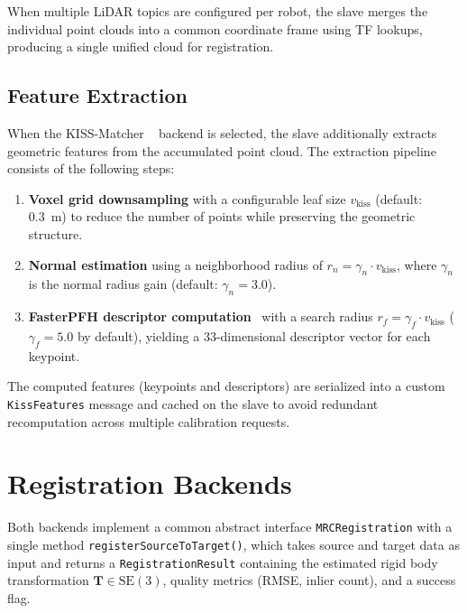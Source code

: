 When multiple LiDAR topics are configured per robot, the slave merges the
individual point clouds into a common coordinate frame using TF lookups,
producing a single unified cloud for registration.

\subsection{Feature Extraction}
\label{sec:feature_extraction}

When the KISS-Matcher ~\cite{KISSMATCHER} backend is selected, the slave additionally extracts
geometric features from the accumulated point cloud.
The extraction pipeline consists of the following steps:

\begin{enumerate}
    \item \textbf{Voxel grid downsampling} with a configurable leaf size
          $v_\mathrm{kiss}$ (default: \SI{0.3}{\metre}) to reduce the number
          of points while preserving the geometric structure.
    \item \textbf{Normal estimation} using a neighborhood radius of
          $r_n = \gamma_n \cdot v_\mathrm{kiss}$, where $\gamma_n$ is the
          normal radius gain (default: $\gamma_n = 3.0$).
    \item \textbf{FasterPFH descriptor computation}~\cite{KISSMATCHER} with a
          search radius $r_f = \gamma_f \cdot v_\mathrm{kiss}$
          ($\gamma_f = 5.0$ by default), yielding a 33-dimensional descriptor
          vector for each keypoint.
\end{enumerate}

The computed features (keypoints and descriptors) are serialized into a custom
\texttt{KissFeatures} message and cached on the slave to avoid redundant
recomputation across multiple calibration requests.

\section{Registration Backends}
\label{sec:registration_backends}

Both backends implement a common abstract interface \texttt{MRCRegistration}
with a single method \texttt{registerSourceToTarget()}, which takes source and
target data as input and returns a \texttt{RegistrationResult} containing the
estimated rigid body transformation
$\mathbf{T} \in \mathrm{SE}(3)$,
quality metrics (RMSE, inlier count), and a success flag.

